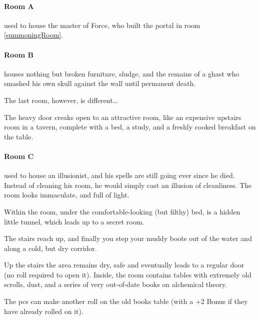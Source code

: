 \showStdSpells


\showStdSpells

\paragraph{Room A} used to house the master of Force, who built the portal in room \ref{summoningRoom}.

\paragraph{Room B} houses nothing but broken furniture, sludge, and the remains of a ghast who smashed his own skull against the wall until permanent death.

The last room, however, is different\ldots

\begin{boxtext}
  The heavy door creaks open to an attractive room, like an expensive upstairs room in a tavern, complete with a bed, a study, and a freshly cooked breakfast on the table.
\end{boxtext}
\paragraph{Room C} used to house an illusionist, and his spells are still going ever since he died.
Instead of cleaning his room, he would simply cast an illusion of cleanliness.
The room looks immaculate, and full of light.

Within the room, under the comfortable-looking (but filthy) bed, is a hidden little tunnel, which leads up to a secret room.

\begin{boxtext}
  The stairs reach up, and finally you step your muddy boots out of the water and along a cold, but dry corridor.
\end{boxtext}


Up the stairs the area remains dry, safe and eventually leads to a regular door (no roll required to open it).
Inside, the room contains tables with extremely old scrolls, dust, and a series of very out-of-date books on alchemical theory.

The \glspl{pc} can make another roll on the old books table  (with a +2 Bonus if they have already rolled on it).

